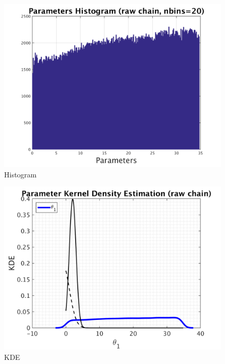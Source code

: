 \begin{figure}[h!]
  
  \centering
   \includegraphics[scale=0.75]{output_500/simple_ip_hist_raw}
   \caption{Histogram}
\end{figure}



\begin{figure}[h!]
  
  \centering
   \includegraphics[scale=0.75]{output_500/simple_ip_kde_raw}
   \caption{ KDE }
\end{figure}

